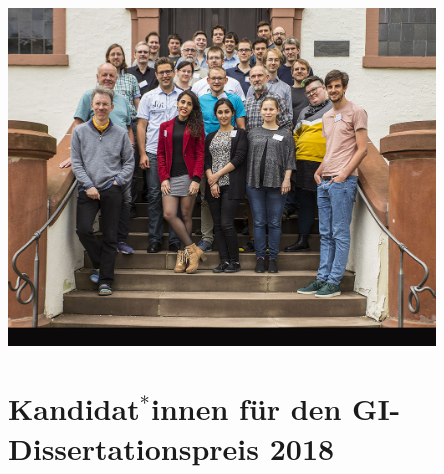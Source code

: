 \documentclass{lni}
\begin{document}
\vfill

\centerline{\includegraphics[width=0.85\textwidth]{gidiss18gruppe.jpg}}

% 

\newpage

\section*{Kandidat$^*$innen f\"ur den GI-Dissertationspreis 2018}

\setlength{\tabcolsep}{0pt}
\end{document}
